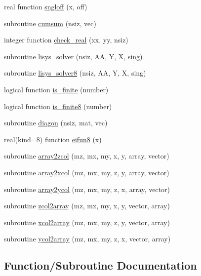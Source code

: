 \begin{DoxyCompactItemize}
\item 
real function \hyperlink{numutils_8f90_a97ff3973394dba1b9534e055e358de97}{sngloff} (x, off)
\item 
subroutine \hyperlink{numutils_8f90_a4c6620f6e7e0c517c0680ce839de1a3e}{cumsum} (nsiz, vec)
\item 
integer function \hyperlink{numutils_8f90_a150883e942654a69b910d409aff3ab11}{check\+\_\+real} (xx, yy, nsiz)
\item 
subroutine \hyperlink{numutils_8f90_aed75a09149da8b66e7ed22e28d081c65}{lisys\+\_\+solver} (nsiz, AA, Y, X, sing)
\item 
subroutine \hyperlink{numutils_8f90_a4a474fb2edbafe34d84319dd1ffe33b3}{lisys\+\_\+solver8} (nsiz, AA, Y, X, sing)
\item 
logical function \hyperlink{numutils_8f90_a356dac086cc0a55c018133b955b8623b}{is\+\_\+finite} (number)
\item 
logical function \hyperlink{numutils_8f90_a695c126cc1d3849b237378e567623975}{is\+\_\+finite8} (number)
\item 
subroutine \hyperlink{numutils_8f90_a1c300c3f8e7655f895404d3bb918f670}{diagon} (nsiz, mat, vec)
\item 
real(kind=8) function \hyperlink{numutils_8f90_a87009269fa8aecf49be15f20599f3052}{eifun8} (x)
\item 
subroutine \hyperlink{numutils_8f90_a4729e98a12ce5e8cec69efa1d7e7e505}{array2zcol} (mz, mx, my, x, y, array, vector)
\item 
subroutine \hyperlink{numutils_8f90_aa85bcfd6bde31917552031655bbfa562}{array2xcol} (mz, mx, my, z, y, array, vector)
\item 
subroutine \hyperlink{numutils_8f90_a779adf7360ff4e63f7c87643af734fd4}{array2ycol} (mz, mx, my, z, x, array, vector)
\item 
subroutine \hyperlink{numutils_8f90_a1c3b4e4df696e6580d47ec58fdd5ca66}{zcol2array} (mz, mx, my, x, y, vector, array)
\item 
subroutine \hyperlink{numutils_8f90_aec848707c159e9a2b71a8c4a1060b078}{xcol2array} (mz, mx, my, z, y, vector, array)
\item 
subroutine \hyperlink{numutils_8f90_ac925c612eb36229ca068d721a6262204}{ycol2array} (mz, mx, my, z, x, vector, array)
\end{DoxyCompactItemize}


\subsection{Function/\+Subroutine Documentation}
